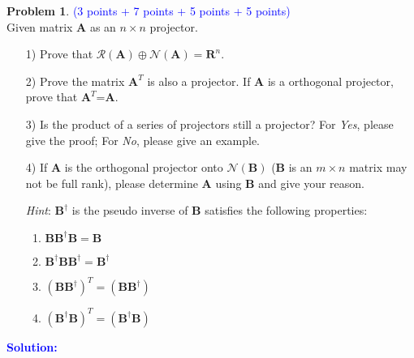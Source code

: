 \documentclass[english,onecolumn]{IEEEtran}
\begin{document}
\noindent\textbf{Problem 1}. \textcolor{blue}{(3 points + 7 points + 5 points + 5 points)}\\
 Given matrix $\mathbf{A}$ as an $n \times n$ projector.
\begin{itemize}
\item[1)] Prove that $\mathcal{R}(\mathbf{A}) \oplus \mathcal{N}(\mathbf{A})= \mathbf{R}^{n}$. 
\item[2)] Prove the matrix $\mathbf{A}^{T}$ is also a projector. If $\mathbf{A}$ is a orthogonal projector, prove that $\mathbf{A}^{T}$=$\mathbf{A}$.
\item[3)] Is the product of a series of projectors still a projector? For \emph{Yes}, please give the proof; For \emph{No}, please give an example.
\item[4)] If $\mathbf{A}$ is the orthogonal projector onto $\mathcal{N}(\mathbf{B})$ ($\mathbf{B}$ is an $m \times n$ matrix may not be full rank), please determine $\mathbf{A}$ using $\mathbf{B}$ and give your reason.

\emph{Hint}: $\mathbf{B}^{\dag}$ is the pseudo inverse of $\mathbf{B}$ satisfies the following properties:
\begin{enumerate}
    \item $\mathbf{B}\mathbf{B}^{\dag}\mathbf{B}=\mathbf{B}$
    \item
    $\mathbf{B}^{\dag}\mathbf{B}\mathbf{B}^{\dag}=\mathbf{B}^{\dag}$
    \item
    $(\mathbf{B}\mathbf{B}^{\dag})^{T}=(\mathbf{B}\mathbf{B}^{\dag})$
    \item
     $(\mathbf{B}^{\dag}\mathbf{B})^{T}=(\mathbf{B}^{\dag}\mathbf{B})$   
\end{enumerate}
\end{itemize}

\noindent\textcolor{blue}{
\textbf{Solution:}
}

\noindent
\end{document}
